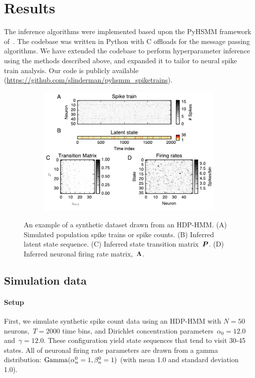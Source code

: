 \section{Results}
The inference algorithms were implemented based upon the PyHSMM
framework of~\citep{Johnson14b}. The codebase was written in Python
with C offloads for the message passing algorithms.  We have
extended the codebase to perform hyperparameter inference using the
methods described above, and expanded it to tailor to neural spike
train analysis. Our code is publicly available
({\url{https://github.com/slinderman/pyhsmm_spiketrains}}).


\begin{figure}
  \centering
  \begin{subfigure}[t]{5.in}
    \includegraphics[width=\textwidth]{figures/ch5/Fig1.pdf}
  \end{subfigure}
  \vspace{-.2in}
  \caption[A synthetic dataset drawn from an HDP-HMM]{ An example of a
    synthetic dataset drawn from an HDP-HMM.  (A) Simulated population
    spike trains or spike counts. (B) Inferred latent state
    sequence. (C) Inferred state transition matrix~$\boldsymbol{P}$. (D) Inferred
    neuronal firing rate matrix,~$\boldsymbol{\Lambda}$.}
\label{fig1}
\end{figure}

 \subsection{Simulation data}

\paragraph{Setup} 
 First, we simulate synthetic spike count data using an HDP-HMM with
 ${N=50}$ neurons,~${T=2000}$ time bins, and Dirichlet concentration
 parameters~$\alpha_0=12.0$ and~$\gamma=12.0$. These configuration
 yield state sequences that tend to visit 30-45 states. All of
 neuronal firing rate parameters are drawn from a gamma distribution:
 $\mathrm{Gamma}(\alpha_n^0=1, \beta_n^0=1)$ (with mean 1.0 and standard
 deviation 1.0).
 

